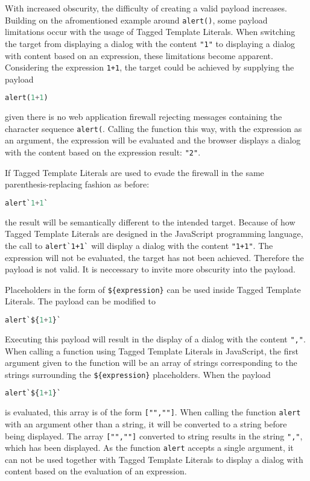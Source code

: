 With increased obscurity, the difficulty of creating a valid payload increases. Building on the afromentioned example around \verb|alert()|, some payload limitations occur with the usage of Tagged Template Literals. When switching the target from displaying a dialog with the content \verb|"1"| to displaying a dialog with content based on an expression, these limitations become apparent. Considering the expression \verb|1+1|, the target could be achieved by supplying the payload
\begin{lstlisting}[style=basicStyle, language=Python]
alert(1+1)
\end{lstlisting}
given there is no web application firewall rejecting messages containing the character sequence \verb|alert(|. Calling the function this way, with the expression as an argument, the expression will be evaluated and the browser displays a dialog with the content based on the expression result: \verb|"2"|.

If Tagged Template Literals are used to evade the firewall in the same parenthesis-replacing fashion as before: 
\begin{lstlisting}[style=basicStyle, language=Python]
alert`1+1`
\end{lstlisting}
the result will be semantically different to the intended target.
Because of how Tagged Template Literals are designed in the JavaScript programming language, the call to \verb|alert`1+1`| will display a dialog with the content \verb|"1+1"|. The expression will not be evaluated, the target has not been achieved. Therefore the payload is not valid. It is neccessary to invite more obscurity into the payload. 

Placeholders in the form of \verb|${expression}| can be used inside Tagged Template Literals. The payload can be modified to 
\begin{lstlisting}[style=basicStyle, language=Python]
alert`${1+1}`
\end{lstlisting}
Executing this payload will result in the display of a dialog with the content \verb|","|. When calling a function using Tagged Template Literals in JavaScript, the first argument given to the function will be an array of strings corresponding to the strings surrounding the \verb|${expression}| placeholders. 
When the payload
\begin{lstlisting}[style=basicStyle, language=Python]
alert`${1+1}`
\end{lstlisting}
is evaluated, this array is of the form \verb|["",""]|. When calling the function \verb|alert| with an argument other than a string, it will be converted to a string before being displayed. The array \verb|["",""]| converted to string results in the string \verb|","|, which has been displayed. 
As the function \verb|alert| accepts a single argument, it can not be used together with Tagged Template Literals to display a dialog with content based on the evaluation of an expression.

